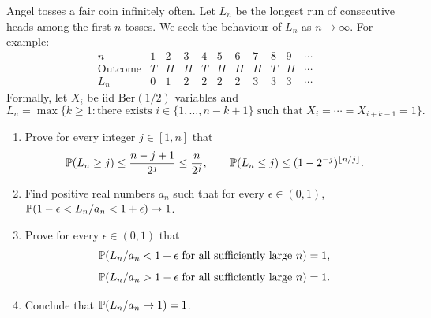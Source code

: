 \documentclass[a4paper]{report}
\begin{document}
\begin{problem}
Angel tosses a fair coin infinitely often. Let $L_n$ be the longest run of consecutive heads among the first $n$ tosses. We seek the behaviour of $L_n$ as $n\to\infty$. For example:
\[\begin{array}{c|cccccccccc}n&1&2&3&4&5&6&7&8&9&\cdots\\\hline\text{Outcome}&T&H&H&T&H&H&H&T&H&\cdots\\L_n&0&1&2&2&2&2&3&3&3&\cdots\end{array}\]
Formally, let $X_i$ be iid $\mathrm{Ber}(1/2)$ variables and
\[L_n=\max\{k\geq1:\text{there exists }i\in\{1,\ldots,n-k+1\}\text{ such that }X_i=\cdots=X_{i+k-1}=1\}.\]
\begin{enumerate}
\item Prove for every integer $j\in[1,n]$ that
\[\P(L_n\geq j)\leq\frac{n-j+1}{2^j}\leq\frac n{2^j},\qquad\P(L_n\leq j)\leq(1-2^{-j})^{\lfloor n/j\rfloor}.\]
\item Find positive real numbers $a_n$ such that for every $\epsilon\in(0,1)$,
$\P(1-\epsilon<L_n/a_n<1+\epsilon)\to1$.
\item Prove for every $\epsilon\in(0,1)$ that
\[\P(L_n/a_n<1+\epsilon\text{ for all sufficiently large }n)=1,\]
\[\P(L_n/a_n>1-\epsilon\text{ for all sufficiently large }n)=1.\]
\item Conclude that $\P(L_n/a_n\to1)=1$.
\end{enumerate}
\end{problem}
\end{document}
